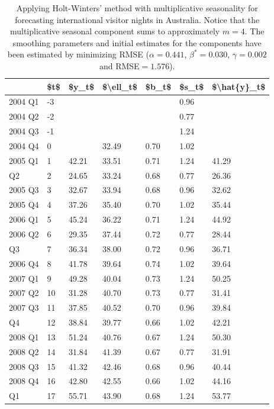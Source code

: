 \documentclass[]{book}
\begin{document}
\begin{table}[t]

\caption{\label{tab:tab76}Applying Holt-Winters' method with multiplicative seasonality for forecasting international visitor nights in Australia. Notice that the multiplicative seasonal component sums to approximately $m=4$. The smoothing parameters and initial estimates for the components have been estimated by minimizing RMSE ($\alpha=0.441$, $\beta^*=0.030$, $\gamma=0.002$ and RMSE$=1.576$).}
\centering
\begin{tabular}{lllllll}
\toprule
  & \$t\$ & \$y\_t\$ & \$\textbackslash{}ell\_t\$ & \$b\_t\$ & \$s\_t\$ & \$\textbackslash{}hat\{y\}\_t\$\\
\midrule
2004 Q1 & -3 &  &  &  & 0.96 & \\
2004 Q2 & -2 &  &  &  & 0.77 & \\
2004 Q3 & -1 &  &  &  & 1.24 & \\
2004 Q4 & 0 &  & 32.49 & 0.70 & 1.02 & \\
2005 Q1 & 1 & 42.21 & 33.51 & 0.71 & 1.24 & 41.29\\
\addlinespace
2005 Q2 & 2 & 24.65 & 33.24 & 0.68 & 0.77 & 26.36\\
2005 Q3 & 3 & 32.67 & 33.94 & 0.68 & 0.96 & 32.62\\
2005 Q4 & 4 & 37.26 & 35.40 & 0.70 & 1.02 & 35.44\\
2006 Q1 & 5 & 45.24 & 36.22 & 0.71 & 1.24 & 44.92\\
2006 Q2 & 6 & 29.35 & 37.44 & 0.72 & 0.77 & 28.44\\
\addlinespace
2006 Q3 & 7 & 36.34 & 38.00 & 0.72 & 0.96 & 36.71\\
2006 Q4 & 8 & 41.78 & 39.64 & 0.74 & 1.02 & 39.64\\
2007 Q1 & 9 & 49.28 & 40.04 & 0.73 & 1.24 & 50.25\\
2007 Q2 & 10 & 31.28 & 40.70 & 0.73 & 0.77 & 31.41\\
2007 Q3 & 11 & 37.85 & 40.52 & 0.70 & 0.96 & 39.84\\
\addlinespace
2007 Q4 & 12 & 38.84 & 39.77 & 0.66 & 1.02 & 42.21\\
2008 Q1 & 13 & 51.24 & 40.76 & 0.67 & 1.24 & 50.30\\
2008 Q2 & 14 & 31.84 & 41.39 & 0.67 & 0.77 & 31.91\\
2008 Q3 & 15 & 41.32 & 42.46 & 0.68 & 0.96 & 40.44\\
2008 Q4 & 16 & 42.80 & 42.55 & 0.66 & 1.02 & 44.16\\
\addlinespace
2009 Q1 & 17 & 55.71 & 43.90 & 0.68 & 1.24 & 53.77\\

\end{tabular}
\end{table}
\end{document}
